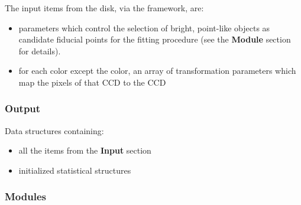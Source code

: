The input items from the disk, via the framework, are:
\begin{itemize}
  \item parameters which control the selection of bright, point-like objects as
        candidate fiducial points for the fitting procedure (see the {\bf
        Module} section for details).
  \item for each color except the \/ color, an array of transformation
        parameters which map the pixels of that CCD to the \/ CCD
\end{itemize}

\subsubsection{Output}

Data structures containing:
\begin{itemize}
  \item all the items from the {\bf Input} section 
  \item initialized statistical structures	 
\end{itemize} 

\subsubsection{Modules}

